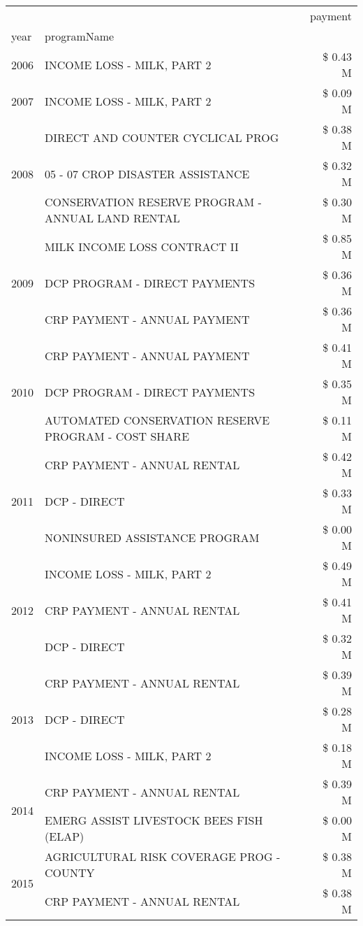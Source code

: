 \begin{tabular}{llr}
\toprule
 &  & payment \\
year & programName &  \\
\midrule
2006 & INCOME LOSS - MILK, PART 2 & \$ 0.43 M \\
\cline{1-3}
2007 & INCOME LOSS - MILK, PART 2 & \$ 0.09 M \\
\cline{1-3}
\multirow[t]{3}{*}{2008} & DIRECT AND COUNTER CYCLICAL PROG & \$ 0.38 M \\
 & 05 - 07 CROP DISASTER ASSISTANCE & \$ 0.32 M \\
 & CONSERVATION RESERVE PROGRAM - ANNUAL LAND RENTAL & \$ 0.30 M \\
\cline{1-3}
\multirow[t]{3}{*}{2009} & MILK INCOME LOSS CONTRACT II & \$ 0.85 M \\
 & DCP PROGRAM - DIRECT PAYMENTS & \$ 0.36 M \\
 & CRP PAYMENT - ANNUAL PAYMENT & \$ 0.36 M \\
\cline{1-3}
\multirow[t]{3}{*}{2010} & CRP PAYMENT - ANNUAL PAYMENT & \$ 0.41 M \\
 & DCP PROGRAM - DIRECT PAYMENTS & \$ 0.35 M \\
 & AUTOMATED CONSERVATION RESERVE PROGRAM - COST SHARE & \$ 0.11 M \\
\cline{1-3}
\multirow[t]{3}{*}{2011} & CRP PAYMENT - ANNUAL RENTAL & \$ 0.42 M \\
 & DCP - DIRECT & \$ 0.33 M \\
 & NONINSURED ASSISTANCE PROGRAM & \$ 0.00 M \\
\cline{1-3}
\multirow[t]{3}{*}{2012} & INCOME LOSS - MILK, PART 2 & \$ 0.49 M \\
 & CRP PAYMENT - ANNUAL RENTAL & \$ 0.41 M \\
 & DCP - DIRECT & \$ 0.32 M \\
\cline{1-3}
\multirow[t]{3}{*}{2013} & CRP PAYMENT - ANNUAL RENTAL & \$ 0.39 M \\
 & DCP - DIRECT & \$ 0.28 M \\
 & INCOME LOSS - MILK, PART 2 & \$ 0.18 M \\
\cline{1-3}
\multirow[t]{2}{*}{2014} & CRP PAYMENT - ANNUAL RENTAL & \$ 0.39 M \\
 & EMERG ASSIST LIVESTOCK BEES FISH (ELAP) & \$ 0.00 M \\
\cline{1-3}
\multirow[t]{3}{*}{2015} & AGRICULTURAL RISK COVERAGE PROG - COUNTY & \$ 0.38 M \\
 & CRP PAYMENT - ANNUAL RENTAL & \$ 0.38 M \\

\end{tabular}

